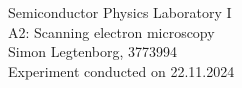 \begin{centering}
	\huge Semiconductor Physics Laboratory \RN{1}\\
	\LARGE A2: Scanning electron microscopy \\
	\vspace{0.35cm}
	\normalsize Simon Legtenborg, 3773994 \\ 
	\normalsize Experiment conducted on 22.11.2024 \\
	\vspace{1cm}
\end{centering}
